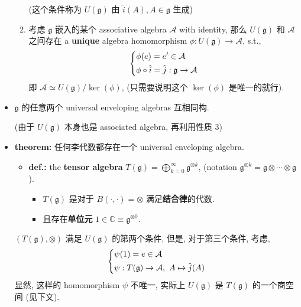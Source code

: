 \begin{itemize}
\begin{enumerate}
		(这个条件称为 $U(\mathfrak{g})$ 由 $\hat{i}(A), A \in \mathfrak{g}$ 生成)
		
		\item 考虑 $\mathfrak{g}$ 嵌入的某个 associative algebra $\mathcal{A}$ with identity, 那么 $U(\mathfrak{g})$ 和 $\mathcal{A}$ 之间存在 a \textbf{unique} algebra homomorphism $\phi : U(\mathfrak{g}) \rightarrow \mathcal{A}$, s.t.,
		\begin{equation}
			\begin{dcases}
				\phi(e) = e' \in \mathcal{A} \\
				\phi \circ \hat{i} = \hat{j} : \mathfrak{g} \rightarrow \mathcal{A}
			\end{dcases}
		\end{equation}
		即 $\mathcal{A} \simeq U(\mathfrak{g}) / \ker(\phi)$, (只需要说明这个 $\ker(\phi)$ 是唯一的就行).
	\end{enumerate}
	
	\item $\mathfrak{g}$ 的任意两个 universal enveloping algebras 互相同构.
	
	(由于 $U(\mathfrak{g})$ 本身也是 associated algebra, 再利用性质 3)
	
	\item \textbf{theorem:} 任何李代数都存在一个 universal enveloping algebra.
	
	\begin{tcolorbox}[title=proof:]
		\begin{itemize}
			\item \textbf{def.:} the \textbf{tensor algebra} $T(\mathfrak{g}) = \bigoplus_{k = 0}^\infty \mathfrak{g}^{\otimes k}$, (notation $\mathfrak{g}^{\otimes k} = \mathfrak{g} \otimes \cdots \otimes \mathfrak{g}$).
			\begin{itemize}
				\item $T(\mathfrak{g})$ 是对于 $B(\cdot, \cdot) = \otimes$ 满足\textbf{结合律}的代数.
				
				\item 且存在\textbf{单位元} $1 \in \mathbb{C} \equiv \mathfrak{g}^{\otimes 0}$.
			\end{itemize}
		\end{itemize}
		
		$(T(\mathfrak{g}), \otimes)$ 满足 $U(\mathfrak{g})$ 的第两个条件, 但是, 对于第三个条件, 考虑,
		\begin{equation}
			\begin{dcases}
				\psi(1) = e \in \mathcal{A} \\
				\psi : T(\mathfrak{g}) \rightarrow \mathcal{A}, \ A \mapsto \hat{j}(A)
			\end{dcases}
		\end{equation}
		显然, 这样的 homomorphism $\psi$ 不唯一, 实际上 $U(\mathfrak{g})$ 是 $T(\mathfrak{g})$ 的一个商空间 (见下文).
		

\end{tcolorbox}
\end{itemize}
